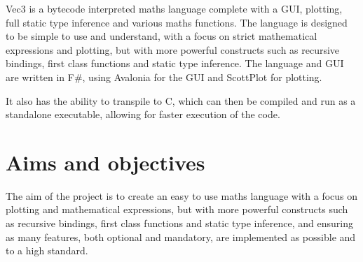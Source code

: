 \documentclass[a4paper, oneside, 11pt]{report}
\begin{document}
Vec3 is a bytecode interpreted maths language complete with a GUI, plotting, full static type inference and various
maths functions.
The language is designed to be simple to use and understand, with a focus on strict mathematical expressions and plotting,
but with more powerful constructs such as recursive bindings, first class functions and static type inference.
The language and GUI are written in F\#, using Avalonia\citep{avalonia} for the GUI and ScottPlot\citep{scottPlot} for plotting.

It also has the ability to transpile to C, which can then be compiled and run as a standalone executable, allowing for
faster execution of the code.

\section{Aims and objectives}\label{sec:aims-and-objectives}

The aim of the project is to create an easy to use maths language with a focus on plotting and mathematical
expressions, but with more powerful constructs such as recursive bindings, first class functions and static type 
inference, and ensuring as many features, both optional and mandatory, are implemented as possible and to a high 
standard.
\end{document}
